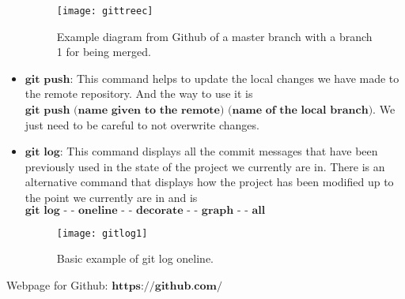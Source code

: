 \begin{itemize}
\begin{figure}[H]
\begin{center}
	\texttt{[image: gittreec]}

\caption{ Example diagram from Github of a master branch with a branch 1 for being merged.}
\label{fig:imggitpull}
\end{center}
\end{figure}

	\item $\textbf{git push:}$ This command helps to update the local changes we have made to the remote repository. And the way to use it is $\textbf{git push (name given to the remote) (name of the local branch)}$. We just need to be careful to not overwrite changes. 
	\item $\textbf{git log:}$  This command displays all the commit messages that have been previously used in the state of the project we currently are in. There is an alternative command that displays how the project has been modified up to the point we currently are in and is $\textbf{git log - - oneline  - - decorate - - graph - - all}$

\begin{figure}[H]
\begin{center}
	\texttt{[image: gitlog1]}

\caption{Basic example of git log oneline.}
\label{fig:imggitlog}
\end{center}
\end{figure}

\end{itemize}

Webpage for Github:
$\textbf{https://github.com/}$
